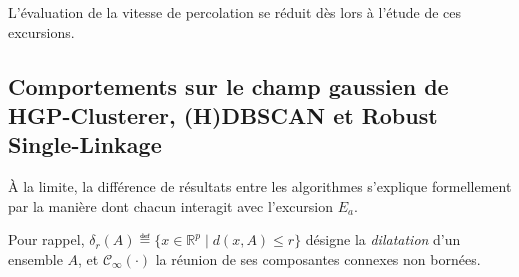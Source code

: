 

L'évaluation de la vitesse de percolation se réduit dès lors à l'étude de ces excursions.

\subsection{Comportements sur le champ gaussien de HGP-Clusterer, (H)DBSCAN et Robust Single-Linkage}

À la limite, la différence de résultats entre les algorithmes s'explique formellement par la manière dont chacun interagit avec l'excursion $E_a$. 

Pour rappel,  $\delta_r(A) \eqdef \{x \in \mathbb R^p \mid d(x, A) \le r\}$ désigne la \emph{dilatation} d'un ensemble $A$, et $\mathcal C_\infty(\cdot)$ la réunion de ses composantes connexes non bornées.


